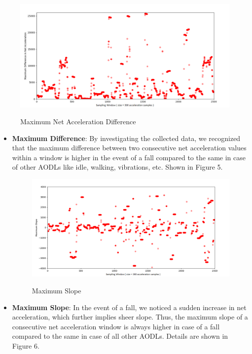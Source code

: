 \begin{enumerate}
\begin{figure}[h!]
\label{Feature maps:1}
\centering
\includegraphics[scale = 0.40]{images/max_difff}
\centering
\label{fig:5}
\caption{Maximum Net Acceleration Difference}
\end{figure}

\begin{itemize}
\item \textbf{Maximum Difference}: By investigating the collected data, we recognized that the maximum difference between two consecutive net acceleration values within a window is higher in the event of a fall compared to the same in case of other AODLs like idle, walking, vibrations, etc. Shown in Figure 5.

\begin{figure}[h!]
\label{Feature maps:2}
\centering
\includegraphics[scale = 0.40]{images/max_slope}
\label{fig:6}
\centering
\caption{Maximum Slope}
\end{figure}

\item \textbf{Maximum Slope}: In the event of a fall, we noticed a sudden increase in net acceleration, which further implies sheer slope. Thus, the maximum slope of a consecutive net acceleration window is always higher in case of a fall compared to the same in case of all other AODLs. Details are shown in Figure 6.


\end{itemize}
\end{enumerate}
